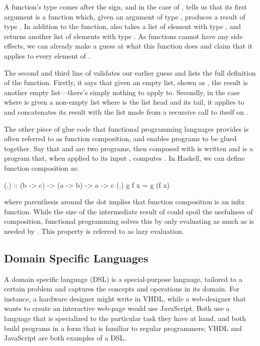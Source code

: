 A function's type comes after the \codei{::} sign, and in the case of , tells us that its first argument is a function  which, given an argument of type , produces a result of type . In addition to the function,  also takes a list  of element with type , and returns another list of elements with type . As functions cannot have any side effects, we can already make a guess at what this function does and claim that it applies  to every element of .

The second and third line of  validates our earlier guess and lists the full definition of the function. Firstly, it says that given an empty list, shown as \codei{[]}, the result is another empty list---there's simply nothing to apply  to. Secondly, in the case where  is given a non-empty list  where  is the list head and  its tail, it applies  to  and concatenates its result with the list made from a recursive call to itself on .

The other piece of glue code that functional programming languages provides is often referred to as function composition, and enables programs to be glued together. Say that  and  are two programs, then  composed with  is written  and is a program that, when applied to its input , computes . In Haskell, we can define function composition as:

\begin{code}
(.) :: (b -> c) -> (a -> b) -> a -> c
(.) g f x = g (f x)
\end{code}

\noindent where parenthesis around the dot implies that function composition is an infix function. While the size of the intermediate result of  could spoil the usefulness of composition, functional programming solves this by only evaluating  as much as is needed by . This property is referred to as lazy evaluation.

\subsection{Domain Specific Languages}

A domain specific language (DSL) is a special-purpose language, tailored to a certain problem and captures the concepts and operations in its domain. For instance, a hardware designer might write in VHDL, while a web-designer that wants to create an interactive web-page would use JavaScript. Both use a language that is specialized to the particular task they have at hand, and both build programs in a form that is familiar to regular programmers; VHDL and JavaScript are both examples of a DSL.

